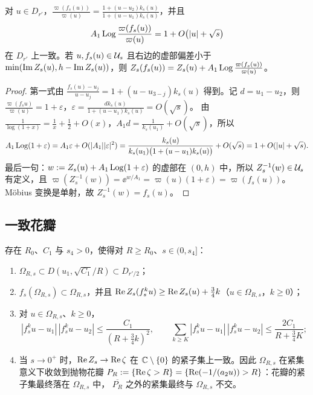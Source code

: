 \begin{lemma}[一步]\label{ch7:lem:Zstep}
对 $u\in D_{r'}$，$\frac{\varpi(f_s(u))}{\varpi(u)}=\frac{1+(u-u_2)k_s(u)}{1+(u-u_1)k_s(u)}$，并且
\[
 A_1\operatorname{Log}\frac{\varpi(f_s(u))}{\varpi(u)}=1+O\bigl(|u|+\sqrt s\bigr)
\]
在 $D_{r'}$ 上一致。若 $u,f_s(u)\in\mathcal U_s$ 且右边的虚部偏差小于 $\min(\operatorname{Im} Z_s(u),h-\operatorname{Im} Z_s(u))$，则
$Z_s(f_s(u))=Z_s(u)+A_1\operatorname{Log}\frac{\varpi(f_s(u))}{\varpi(u)}$。
\end{lemma}

\begin{proof}
第一式由 $\frac{f_s(u)-u_j}{u-u_j}=1+(u-u_{3-j})k_s(u)$ 得到。记 $d=u_1-u_2$，则
$\frac{\varpi(f_s u)}{\varpi(u)}=1+\varepsilon$，$\varepsilon=\frac{dk_s(u)}{1+(u-u_1)k_s(u)}=O(\sqrt s)$。
由 $\frac1{\log(1+x)}=\frac1x+\frac12+O(x)$，$A_1d=\frac1{k_s(u_1)}+O(\sqrt s)$，所以
\[
 A_1\operatorname{Log}(1+\varepsilon)=A_1\varepsilon+O(|A_1||\varepsilon|^2)=\frac{k_s(u)}{k_s(u_1)\bigl(1+(u-u_1)k_s(u)\bigr)}+O(\sqrt s)=1+O(|u|+\sqrt s).
\]
最后一句：$w:=Z_s(u)+A_1\operatorname{Log}(1+\varepsilon)$ 的虚部在 $(0,h)$ 中，所以 $Z_s^{-1}(w)\in\mathcal U_s$ 有定义，且
$\varpi(Z_s^{-1}(w))=\ee^{w/A_1}=\varpi(u)(1+\varepsilon)=\varpi(f_s(u))$。Möbius 变换是单射，故 $Z_s^{-1}(w)=f_s(u)$。
\end{proof}

\subsection{一致花瓣}

\begin{lemma}[一致花瓣]\label{lem:petal}
存在 $R_0$、$C_1$ 与 $s_4>0$，使得对 $R\ge R_0$、$s\in(0,s_4]$：
\begin{enumerate}
\item $\Omega_{R,s}\subset D(u_1,\sqrt{C_1}/R)\subset D_{r'/2}$；
\item $f_s(\Omega_{R,s})\subset\Omega_{R,s}$，并且 $\operatorname{Re} Z_s(f_s^ku)\ge\operatorname{Re} Z_s(u)+\frac34k$（$u\in\Omega_{R,s}$，$k\ge0$）；
\item 对 $u\in\Omega_{R,s}$、$k\ge0$，
  \[
   |f_s^ku-u_1|\,|f_s^ku-u_2|\le\frac{C_1}{(R+\frac34k)^2},\qquad
   \sum_{k\ge K}|f_s^ku-u_1|\,|f_s^ku-u_2|\le\frac{2C_1}{R+\frac34K};
  \]
\item 当 $s\to0^+$ 时，$\operatorname{Re} Z_s\to\operatorname{Re}\zeta$ 在 $\mathbb{C}\setminus\{0\}$ 的紧子集上一致。因此 $\Omega_{R,s}$ 在紧集意义下收敛到抛物花瓣
  $P_R:=\{\operatorname{Re}\zeta>R\}=\{\operatorname{Re}(-1/(a_2u))>R\}$：花瓣的紧子集最终落在 $\Omega_{R,s}$ 中，
  $\overline{P_R}$ 之外的紧集最终与 $\Omega_{R,s}$ 不交。
\end{enumerate}
\end{lemma}

